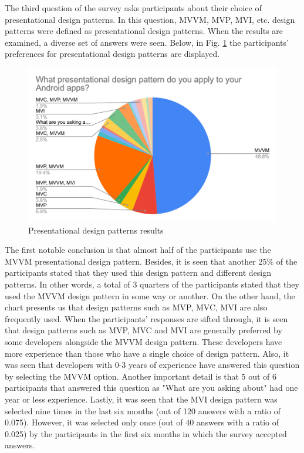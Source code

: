 The third question of the survey asks participants about their choice of presentational design patterns. In this question, MVVM, MVP, MVI, etc. design patterns were defined as presentational design patterns. When the results are  examined, a diverse set of answers were seen. Below, in Fig. \ref{fig:design_pattern} the participants' preferences for presentational design patterns are displayed.
\begin{figure}[ht!]
    \centering
    \includegraphics[scale=0.3]{figures/design_pattern.png}
    \caption{Presentational design patterns results}
    \label{fig:design_pattern}
\end{figure}
\FloatBarrier
The first notable conclusion is that almost half of the participants use the MVVM presentational design pattern. Besides, it is seen that another 25\% of the participants stated that they used this design pattern and different design patterns. In other words, a total of 3 quarters of the participants stated that they used the MVVM design pattern in some way or another. On the other hand, the chart presents us that design patterns such as MVP, MVC, MVI are also frequently used. When the participants' responses are sifted through, it is seen that design patterns such as MVP, MVC and MVI are generally preferred by some developers alongside the MVVM design pattern. These developers have more experience than those who have a single choice of design pattern. Also, it was seen that developers with 0-3 years of experience have answered this question by selecting the MVVM option. Another important detail is that 5 out of 6 participants that answered this question as "What are you asking about" had one year or less experience. Lastly, it was seen that the MVI design pattern was selected nine times in the last six months (out of 120 answers with a ratio of 0.075). However, it was selected only once (out of 40 answers with a ratio of 0.025) by the participants in the first six months in which the survey accepted answers.

